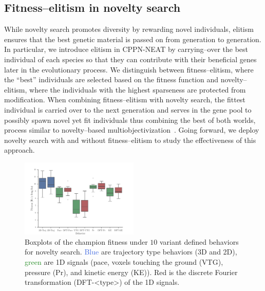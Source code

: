 \documentclass{sig-alternate}
\begin{document}
\subsection{Fitness--elitism in novelty search}
While novelty search promotes diversity by rewarding novel individuals, elitism ensures that the best genetic material is passed on from generation to generation. In particular, we introduce elitism in CPPN-NEAT by carrying--over the best individual of each species so that they can contribute with their beneficial genes later in the evolutionary process. We distinguish between fitness--elitism, where the ``best'' individuals are selected based on the fitness function and novelty--elitism, where the individuals with the highest sparseness are protected from modification. When combining fitness--elitism with novelty search, the fittest individual is carried over to the next generation and serves in the gene pool to possibly spawn novel yet fit individuals thus combining the best of both worlds, process similar to novelty--based multiobjectivization~\cite{mouret2011novelty}. Going forward, we deploy novelty search with and without fitness--elitism to study the effectiveness of this approach.


\begin{figure}[t!]
\vspace{0.2cm}
\centering
\includegraphics[width=0.5\textwidth]{../Figures/Results/BehaviorPerformanceNoveltyOnly.pdf}
\caption{Boxplots of the champion fitness under $10$ variant defined behaviors for novelty search. \textcolor{RoyalBlue}{Blue} are trajectory type behaviors (3D and 2D), \textcolor{ForestGreen}{green} are 1D signals (pace, voxels touching the ground (VTG), pressure (Pr), and kinetic energy (KE)). \textcolor{BrickRed}{Red} is the discrete Fourier transformation (DFT-<type>) of the 1D signals.}
\label{fig:BehaviorsPerformance}
\end{figure}
\end{document}
